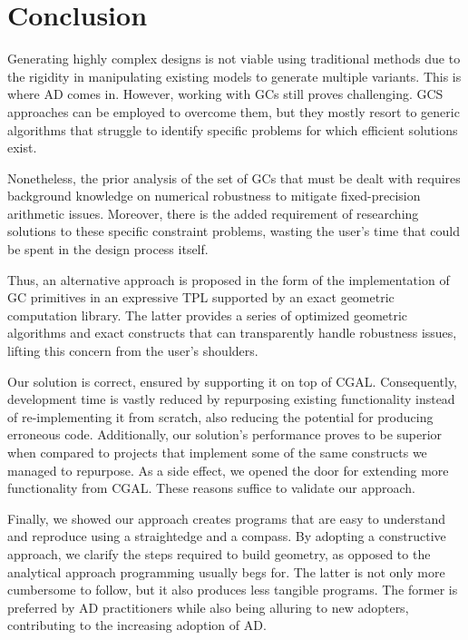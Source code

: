 \section{Conclusion}%
\label{sec:conclusion}

Generating highly complex designs is not viable using traditional
methods due to the rigidity in manipulating existing models to generate multiple
variants.  This is where \ac{AD} comes in.  However, working with \acp{GC} still
proves challenging.  \Ac{GCS} approaches can be employed to overcome them, but
they mostly resort to generic algorithms that struggle to identify specific
problems for which efficient solutions exist.

Nonetheless, the prior analysis of the set of \acp{GC} that must be dealt with
requires background knowledge on numerical robustness to mitigate
fixed-precision arithmetic issues.  Moreover, there is the added requirement of
researching solutions to these specific constraint problems,  wasting the user's
time that could be spent in the design process itself.

Thus, an alternative approach is proposed in the form of the implementation of
\ac{GC} primitives in an expressive \ac{TPL} supported by an exact geometric
computation library.  The latter provides a series of optimized geometric
algorithms and exact constructs that can transparently handle robustness issues,
lifting this concern from the user's shoulders.

Our solution is correct, ensured by supporting it on top of \ac{CGAL}.
Consequently, development time is vastly reduced by repurposing existing
functionality instead of re-implementing it from scratch, also reducing the
potential for producing erroneous code.  Additionally, our solution's
performance proves to be superior when compared to projects that implement some
of the same constructs we managed to repurpose.  As a side effect, we opened the
door for extending more functionality from \ac{CGAL}.  These reasons suffice to
validate our approach.

Finally, we showed our approach creates programs that are easy to understand and
reproduce using a straightedge and a compass.  By adopting a constructive
approach, we clarify the steps required to build geometry, as opposed to the
analytical approach programming usually begs for.  The latter is not only more
cumbersome to follow, but it also produces less tangible programs.  The former
is preferred by \ac{AD} practitioners while also being alluring to new adopters,
contributing to the increasing adoption of \ac{AD}.

